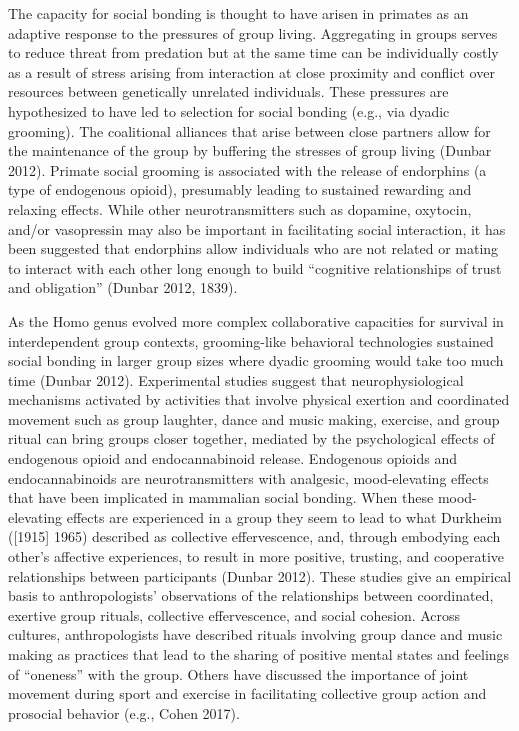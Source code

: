 The capacity for social bonding is thought to have arisen in primates as an adaptive response to the pressures of group living. Aggregating in groups serves to reduce threat from predation but at the same time can be individually costly as a result of stress arising from interaction at close proximity and conflict over resources between genetically unrelated individuals. These pressures are hypothesized to have led to selection for social bonding (e.g., via dyadic grooming). The coalitional alliances that arise between close partners allow for the maintenance of the group by buffering the stresses of group living (Dunbar 2012). Primate social grooming is associated with the release of endorphins (a type of endogenous opioid), presumably leading to sustained rewarding and relaxing effects. While other neurotransmitters such as dopamine, oxytocin, and/or vasopressin may also be important in facilitating social interaction, it has been suggested that endorphins allow individuals who are not related or mating to interact with each other long enough to build “cognitive relationships of trust and obligation” (Dunbar 2012, 1839).

As the Homo genus evolved more complex collaborative capacities for survival in interdependent group contexts, grooming-like behavioral technologies sustained social bonding in larger group sizes where dyadic grooming would take too much time (Dunbar 2012). Experimental studies suggest that neurophysiological mechanisms activated by activities that involve physical exertion and coordinated movement such as group laughter, dance and music making, exercise, and group ritual can bring groups closer together, mediated by the psychological effects of endogenous opioid and endocannabinoid release. Endogenous opioids and endocannabinoids are neurotransmitters with analgesic, mood-elevating effects that have been implicated in mammalian social bonding. When these mood-elevating effects are experienced in a group they seem to lead to what Durkheim ([1915] 1965) described as collective effervescence, and, through embodying each other’s affective experiences, to result in more positive, trusting, and cooperative relationships between participants (Dunbar 2012).
These studies give an empirical basis to anthropologists’ observations of the relationships between coordinated, exertive group rituals, collective effervescence, and social cohesion. Across cultures, anthropologists have described rituals involving group dance and music making as practices that lead to the sharing of positive mental states and feelings of “oneness” with the group. Others have discussed the importance of joint movement during sport and exercise in facilitating collective group action and prosocial behavior (e.g., Cohen 2017).




